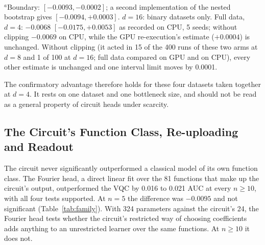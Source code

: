 \documentclass{ieeeaccess}
\newcommand{\vqc}{VQC}
\begin{document}
\begin{table}[t]
\caption{$\Delta(n)$ by bottleneck size, \vqc{} minus the matched head with the same parameter count (24, 48 and 96 at $d=4$, 8 and 16). $d=4$ is the confirmatory row; $d=8$ and 16 are exploratory. All rows use the nested bootstrap of the confirmatory tests. Bold: 95\% interval excludes zero.}
\label{tab:dims}
\centering
\setlength{\tabcolsep}{3pt}
\footnotesize
{}
\\[2pt]{\scriptsize $^{a}$Boundary: $[-0.0093,-0.0002]$; a second implementation of the nested bootstrap gives $[-0.0094,+0.0003]$. $d=16$: binary datasets only. Full data, $d=4$: $-0.0068$ $[-0.0175,+0.0053]$ as recorded on CPU, 5 seeds; without clipping $-0.0069$ on CPU, while the GPU re-execution's estimate ($+0.0004$) is unchanged. Without clipping (it acted in 15 of the 400 runs of these two arms at $d=8$ and 1 of 100 at $d=16$; full data compared on GPU and on CPU), every other estimate is unchanged and one interval limit moves by 0.0001.}
\end{table}

The confirmatory advantage therefore holds for these four datasets taken together at $d=4$. It rests on one dataset and one bottleneck size, and should not be read as a general property of circuit heads under scarcity.

\subsection{The Circuit's Function Class, Re-uploading and Readout}
\label{sec:fourier}
The circuit never significantly outperformed a classical model of its own function class. The Fourier head, a direct linear fit over the 81 functions that make up the circuit's output, outperformed the \vqc{} by 0.016 to 0.021 AUC at every $n\ge10$, with all four tests supported. At $n=5$ the difference was $-0.0095$ and not significant (Table~\ref{tab:family}). With 324 parameters against the circuit's 24, the Fourier head tests whether the circuit's restricted way of choosing coefficients adds anything to an unrestricted learner over the same functions. At $n\ge10$ it does not.
\end{document}
